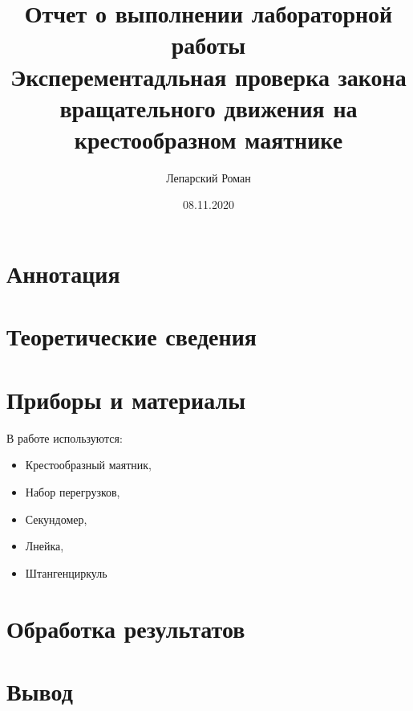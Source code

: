 \documentclass[a4paper, 12pt]{article}
\title{Отчет о выполнении лабораторной работы \\ Эксперементадльная проверка закона вращательного движения на крестообразном маятнике}
\author{Лепарский Роман}
\date{08.11.2020}
\begin{document}
\maketitle

\newpage

\section{Аннотация}


\section{Теоретические сведения}



\section{Приборы и материалы}

В работе используются:

\begin{itemize}
	\item Крестообразный маятник,
	\item Набор перегрузков,
	\item Секундомер,
	\item Лнейка,
	\item Штангенциркуль
\end{itemize}

\section{Обработка результатов}


\section{Вывод}
\end{document}
